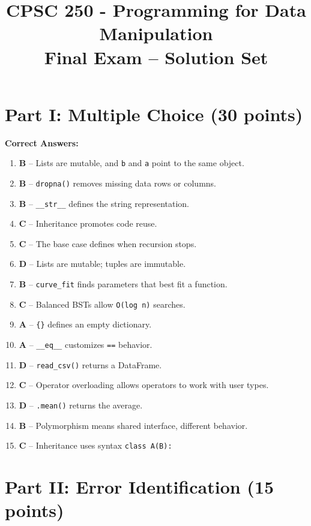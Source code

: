 \documentclass[12pt]{article}
\title{CPSC 250 - Programming for Data Manipulation \\ Final Exam – Solution Set}
\date{}
\begin{document}
\maketitle

\section*{Part I: Multiple Choice (30 points)}

\textbf{Correct Answers:}

\begin{enumerate}[label=\arabic*.]
\item \textbf{B} – Lists are mutable, and \texttt{b} and \texttt{a} point to the same object.
\item \textbf{B} – \texttt{dropna()} removes missing data rows or columns.
\item \textbf{B} – \texttt{\_\_str\_\_} defines the string representation.
\item \textbf{C} – Inheritance promotes code reuse.
\item \textbf{C} – The base case defines when recursion stops.
\item \textbf{D} – Lists are mutable; tuples are immutable.
\item \textbf{B} – \texttt{curve\_fit} finds parameters that best fit a function.
\item \textbf{C} – Balanced BSTs allow \texttt{O(log n)} searches.
\item \textbf{A} – \texttt{\{\}} defines an empty dictionary.
\item \textbf{A} – \texttt{\_\_eq\_\_} customizes \texttt{==} behavior.
\item \textbf{D} – \texttt{read\_csv()} returns a DataFrame.
\item \textbf{C} – Operator overloading allows operators to work with user types.
\item \textbf{D} – \texttt{.mean()} returns the average.
\item \textbf{B} – Polymorphism means shared interface, different behavior.
\item \textbf{C} – Inheritance uses syntax \texttt{class A(B):}
\end{enumerate}

\newpage
\section*{Part II: Error Identification (15 points)}
\end{document}
